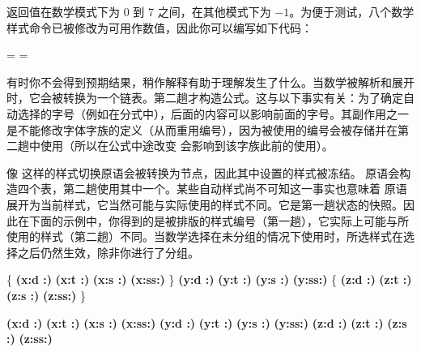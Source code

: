返回值在数学模式下为 0 到 7 之间，在其他模式下为 $-1$。为便于测试，八个数学样式命令已被修改为可用作数值，因此你可以编写如下代码：

\begin{typing}
\ifnum\mathstyle=\textstyle
\else \ifnum\mathstyle=\crampedtextstyle
\fi \fi
\end{typing}

有时你不会得到预期结果，稍作解释有助于理解发生了什么。当数学被解析和展开时，它会被转换为一个链表。第二趟才构造公式。这与以下事实有关：为了确定自动选择的字号（例如在分式中），后面的内容可以影响前面的字号。其副作用之一是不能修改字体字族的定义（从而重用编号），因为被使用的编号会被存储并在第二趟中使用（所以在公式中途改变  会影响到该字族此前的使用）。

像  这样的样式切换原语会被转换为节点，因此其中设置的样式被冻结。 原语会构造四个表，第二趟使用其中一个。某些自动样式尚不可知这一事实也意味着  原语展开为当前样式，它当然可能与实际使用的样式不同。它是第一趟状态的快照。因此在下面的示例中，你得到的是被排版的样式编号（第一趟），它实际上可能与所使用的样式（第二趟）不同。当数学选择在未分组的情况下使用时，所选样式在选择之后仍然生效，除非你进行了分组。

\begin{typing}
    [a:\mathstyle]\quad
    \{
    \mathchoice
        {\bf \scriptstyle       (x:d :\mathstyle)}
        {\bf \scriptscriptstyle (x:t :\mathstyle)}
        {\bf \scriptscriptstyle (x:s :\mathstyle)}
        {\bf \scriptscriptstyle (x:ss:\mathstyle)}
    \}
    \quad[b:\mathstyle]\quad
    \mathchoice
        {\bf \scriptstyle       (y:d :\mathstyle)}
        {\bf \scriptscriptstyle (y:t :\mathstyle)}
        {\bf \scriptscriptstyle (y:s :\mathstyle)}
        {\bf \scriptscriptstyle (y:ss:\mathstyle)}
    \quad[c:\mathstyle]\quad
    \{
    \mathchoice
        {\bf \scriptstyle       (z:d :\mathstyle)}
        {\bf \scriptscriptstyle (z:t :\mathstyle)}
        {\bf \scriptscriptstyle (z:s :\mathstyle)}
        {\bf \scriptscriptstyle (z:ss:\mathstyle)}
    \}
    \quad[d:\mathstyle]
\end{typing}

\begin{typing}
    [a:\mathstyle]\quad
    \begingroup
    \mathchoice
        {\bf \scriptstyle       (x:d :\mathstyle)}
        {\bf \scriptscriptstyle (x:t :\mathstyle)}
        {\bf \scriptscriptstyle (x:s :\mathstyle)}
        {\bf \scriptscriptstyle (x:ss:\mathstyle)}
    \endgroup
    \quad[b:\mathstyle]\quad
    \mathchoice
        {\bf \scriptstyle       (y:d :\mathstyle)}
        {\bf \scriptscriptstyle (y:t :\mathstyle)}
        {\bf \scriptscriptstyle (y:s :\mathstyle)}
        {\bf \scriptscriptstyle (y:ss:\mathstyle)}
    \quad[c:\mathstyle]\quad
    \begingroup
    \mathchoice
        {\bf \scriptstyle       (z:d :\mathstyle)}
        {\bf \scriptscriptstyle (z:t :\mathstyle)}
        {\bf \scriptscriptstyle (z:s :\mathstyle)}
        {\bf \scriptscriptstyle (z:ss:\mathstyle)}
    \endgroup
    \quad[d:\mathstyle]
\end{typing}



